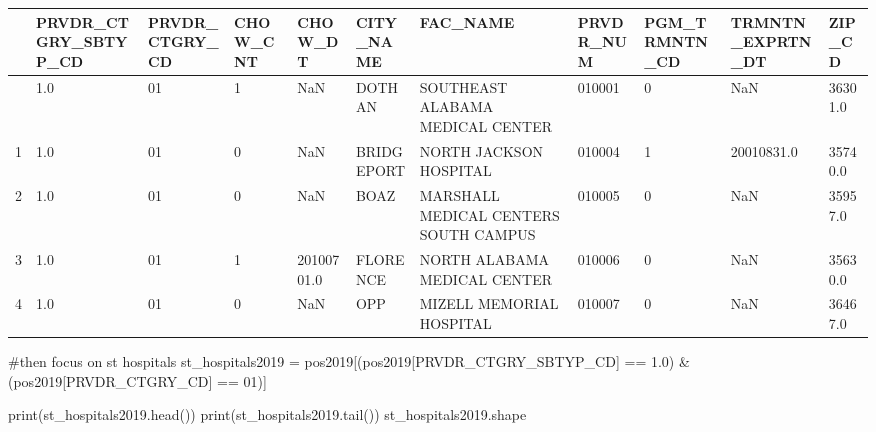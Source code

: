 \documentclass[
  letterpaper,
  DIV=11,
  numbers=noendperiod]{scrartcl}
\newenvironment{Shaded}{\begin{snugshade}}{\end{snugshade}}
\newcommand{\BuiltInTok}[1]{\textcolor[rgb]{0.00,0.23,0.31}{#1}}
\newcommand{\CommentTok}[1]{\textcolor[rgb]{0.37,0.37,0.37}{#1}}
\newcommand{\NormalTok}[1]{\textcolor[rgb]{0.00,0.23,0.31}{#1}}
\newcommand{\OperatorTok}[1]{\textcolor[rgb]{0.37,0.37,0.37}{#1}}
\newcommand{\StringTok}[1]{\textcolor[rgb]{0.13,0.47,0.30}{#1}}
\begin{document}
\begin{longtable}[]{@{}lllllllllll@{}}
\toprule\noalign{}
& PRVDR\_CTGRY\_SBTYP\_CD & PRVDR\_CTGRY\_CD & CHOW\_CNT & CHOW\_DT &
CITY\_NAME & FAC\_NAME & PRVDR\_NUM & PGM\_TRMNTN\_CD &
TRMNTN\_EXPRTN\_DT & ZIP\_CD \\
\midrule\noalign{}
\endhead
\bottomrule\noalign{}
\endlastfoot
0 & 1.0 & 01 & 1 & NaN & DOTHAN & SOUTHEAST ALABAMA MEDICAL CENTER &
010001 & 0 & NaN & 36301.0 \\
1 & 1.0 & 01 & 0 & NaN & BRIDGEPORT & NORTH JACKSON HOSPITAL & 010004 &
1 & 20010831.0 & 35740.0 \\
2 & 1.0 & 01 & 0 & NaN & BOAZ & MARSHALL MEDICAL CENTERS SOUTH CAMPUS &
010005 & 0 & NaN & 35957.0 \\
3 & 1.0 & 01 & 1 & 20100701.0 & FLORENCE & NORTH ALABAMA MEDICAL CENTER
& 010006 & 0 & NaN & 35630.0 \\
4 & 1.0 & 01 & 0 & NaN & OPP & MIZELL MEMORIAL HOSPITAL & 010007 & 0 &
NaN & 36467.0 \\
\end{longtable}

\begin{Shaded}
\begin{Highlighting}[]
\CommentTok{\#then focus on st hospitals }
\NormalTok{st\_hospitals2019 }\OperatorTok{=}\NormalTok{ pos2019[(pos2019[}\StringTok{\textquotesingle{}PRVDR\_CTGRY\_SBTYP\_CD\textquotesingle{}}\NormalTok{] }\OperatorTok{==} \StringTok{\textquotesingle{}1.0\textquotesingle{}}\NormalTok{) }\OperatorTok{\&}\NormalTok{ (pos2019[}\StringTok{\textquotesingle{}PRVDR\_CTGRY\_CD\textquotesingle{}}\NormalTok{] }\OperatorTok{==} \StringTok{\textquotesingle{}01\textquotesingle{}}\NormalTok{)]}

\BuiltInTok{print}\NormalTok{(st\_hospitals2019.head())}
\BuiltInTok{print}\NormalTok{(st\_hospitals2019.tail())}
\NormalTok{st\_hospitals2019.shape}
\end{Highlighting}
\end{Shaded}
\end{document}
